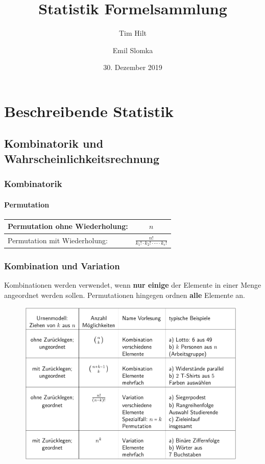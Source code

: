 \documentclass[twoside, a4paper]{report}
\title{Statistik Formelsammlung}
\author{Tim Hilt \and Emil Slomka}
\date{30. Dezember 2019}
\begin{document}
\maketitle
\tableofcontents

\part{Beschreibende Statistik}

\chapter{Kombinatorik und Wahrscheinlichkeitsrechnung}

\section{Kombinatorik}

\subsection{Permutation}

\begin{center}
  \begin{tabular}{lc}
    \toprule
    Permutation ohne Wiederholung: & \(n\!\)\\
    \midrule
    Permutation mit Wiederholung: & \(\displaystyle{\frac{n!}{k_1! \cdot k_2! \cdot \cdots \cdot k_s!}}\)\\
    \bottomrule
  \end{tabular}
\end{center}

\section{Kombination und Variation}

Kombinationen werden verwendet, wenn \textbf{nur einige} der Elemente in einer Menge angeordnet werden sollen. Permutationen hingegen ordnen \textbf{alle} Elemente an.

\begin{figure}[H]
  \centering
  \includegraphics[width=11cm]{Grafiken/Kombinatorik}
\end{figure}
\end{document}
